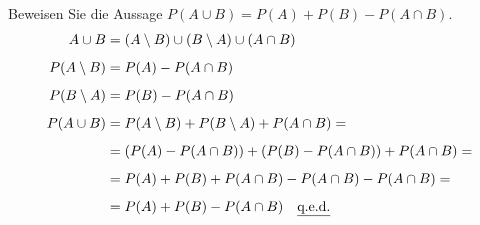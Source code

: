 \documentclass[10pt, oneside]{article}
\begin{document}
Beweisen Sie die Aussage $P(A \cup B) = P(A) + P(B) - P(A \cap B)$.
\begin{equation*}
    \begin{aligned}
        A \cup B &= (A \setminus B) \cup (B \setminus A) \cup (A \cap B) \\[5pt]
        P(A \setminus B) &= P(A) - P(A \cap B) \\[5pt]
        P(B \setminus A) &= P(B) - P(A \cap B) \\[5pt]
        P(A \cup B) &= P(A \setminus B) + P(B \setminus A) + P(A \cap B) = \\[5pt]
                    &= (P(A) - P(A \cap B)) + (P(B) - P(A \cap B)) + P(A \cap B) = \\[5pt]
                    &= P(A) + P(B) + P(A \cap B) - P(A \cap B) - P(A \cap B) = \\[5pt]
                    &= P(A) + P(B) - P(A \cap B) \quad \text{\underline{q.e.d.}}
    \end{aligned}
\end{equation*}
\end{document}
